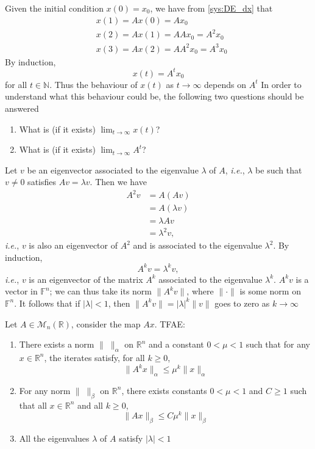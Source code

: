 \documentclass{beamer}
\def\IF{\mathbb{F}}
\def\IN{\mathbb{N}}
\def\IR{\mathbb{R}}
\def\M{\mathcal{M}}
\def\ie{\emph{i.e.}}
\begin{document}
\begin{frame}
Given the initial condition $x(0)=x_0$, we have from \eqref{sys:DE_dx} that
\begin{align*}
 &x(1)= Ax(0)=Ax_0\\
 & x(2)= Ax(1)= AAx_0=A^2x_0 \\
 &x(3)=Ax(2)=AA^2x_0=A^3x_0
\end{align*}
\vfill
By induction,
\[
x(t)=A^tx_0
\] 
for all $t\in\IN$.
Thus the behaviour of $x(t)$ as $t\to\infty$ depends on $A^t$
\vfill
In order to understand what this behaviour could be, the following two questions should be answered
\begin{enumerate}
	\item What is (if it exists) $\lim_{t\to \infty} x(t)$? 
	\item What is (if it exists) $\lim_{t \to \infty} A^t$? 
\end{enumerate}
\end{frame}

\begin{frame}
Let $v$ be an eigenvector associated to the eigenvalue $\lambda$ of $A$, \ie, $\lambda$ be such that $v\neq 0$ satisfies $Av=\lambda v$. Then we have
 \begin{align*}
 A^2v &= A(Av) \\
 &=A(\lambda v) \\
 &=\lambda Av \\
 &=\lambda^2 v,
 \end{align*}
\ie, $v$ is also an eigenvector of $A^2$ and is associated to the eigenvalue $\lambda^2$.
By induction,
\[
A^kv=\lambda^k v,
\]
\ie, $v$ is an eigenvector of the matrix $A^k$ associated to the eigenvalue $\lambda^k$. $A^kv$ is a vector in $\IF^n$; we can thus take its norm $\|A^kv\|$, where $\|\cdot\|$ is some norm on $\IF^n$. It follows that if $|\lambda|<1$, then $\|A^kv\|=|\lambda|^k\|v\|$ goes to zero as $k\to\infty$
\end{frame}


\begin{frame}
\begin{theorem}\label{th:TFAE_DE}
Let $A\in\M_n(\IR)$, consider the map $Ax$. TFAE:
\begin{enumerate}
\item There exists a norm $\|\;\|_\alpha$ on $\IR^n$ and a constant $0<\mu<1$ such that for any $x\in\IR^n$, the iterates satisfy, for all $k\geq 0$,
\[
\|A^kx\|_\alpha\leq \mu^k\|x\|_\alpha
\]
\item For any norm $\|\;\|_\beta$ on $\IR^n$, there exists constants $0<\mu<1$ and $C\geq 1$ such that all $x\in\IR^n$ and all $k\geq 0$,
\[
\|Ax\|_\beta\leq C\mu^k\|x\|_\beta
\]
\item All the eigenvalues $\lambda$ of $A$ satisfy $|\lambda|<1$
\end{enumerate}
\end{theorem}
\end{frame}
\end{document}
